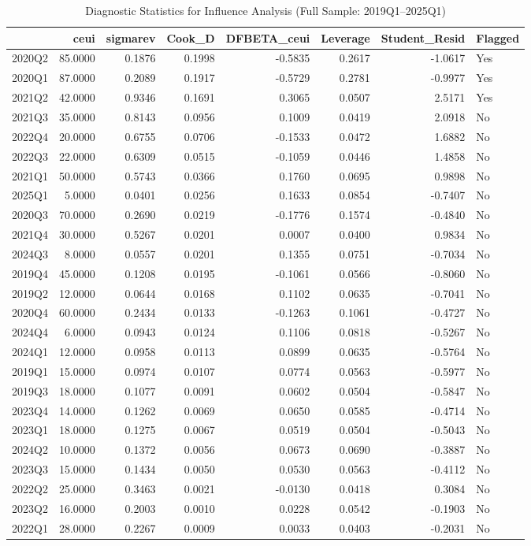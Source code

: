 \begin{table}
\caption{Diagnostic Statistics for Influence Analysis (Full Sample: 2019Q1--2025Q1)}
\label{tab:influence_appendix}
\begin{tabular}{lrrrrrrl}
\toprule
 & ceui & sigmarev & Cook_D & DFBETA_ceui & Leverage & Student_Resid & Flagged \\
\midrule
2020Q2 & 85.0000 & 0.1876 & 0.1998 & -0.5835 & 0.2617 & -1.0617 & Yes \\
2020Q1 & 87.0000 & 0.2089 & 0.1917 & -0.5729 & 0.2781 & -0.9977 & Yes \\
2021Q2 & 42.0000 & 0.9346 & 0.1691 & 0.3065 & 0.0507 & 2.5171 & Yes \\
2021Q3 & 35.0000 & 0.8143 & 0.0956 & 0.1009 & 0.0419 & 2.0918 & No \\
2022Q4 & 20.0000 & 0.6755 & 0.0706 & -0.1533 & 0.0472 & 1.6882 & No \\
2022Q3 & 22.0000 & 0.6309 & 0.0515 & -0.1059 & 0.0446 & 1.4858 & No \\
2021Q1 & 50.0000 & 0.5743 & 0.0366 & 0.1760 & 0.0695 & 0.9898 & No \\
2025Q1 & 5.0000 & 0.0401 & 0.0256 & 0.1633 & 0.0854 & -0.7407 & No \\
2020Q3 & 70.0000 & 0.2690 & 0.0219 & -0.1776 & 0.1574 & -0.4840 & No \\
2021Q4 & 30.0000 & 0.5267 & 0.0201 & 0.0007 & 0.0400 & 0.9834 & No \\
2024Q3 & 8.0000 & 0.0557 & 0.0201 & 0.1355 & 0.0751 & -0.7034 & No \\
2019Q4 & 45.0000 & 0.1208 & 0.0195 & -0.1061 & 0.0566 & -0.8060 & No \\
2019Q2 & 12.0000 & 0.0644 & 0.0168 & 0.1102 & 0.0635 & -0.7041 & No \\
2020Q4 & 60.0000 & 0.2434 & 0.0133 & -0.1263 & 0.1061 & -0.4727 & No \\
2024Q4 & 6.0000 & 0.0943 & 0.0124 & 0.1106 & 0.0818 & -0.5267 & No \\
2024Q1 & 12.0000 & 0.0958 & 0.0113 & 0.0899 & 0.0635 & -0.5764 & No \\
2019Q1 & 15.0000 & 0.0974 & 0.0107 & 0.0774 & 0.0563 & -0.5977 & No \\
2019Q3 & 18.0000 & 0.1077 & 0.0091 & 0.0602 & 0.0504 & -0.5847 & No \\
2023Q4 & 14.0000 & 0.1262 & 0.0069 & 0.0650 & 0.0585 & -0.4714 & No \\
2023Q1 & 18.0000 & 0.1275 & 0.0067 & 0.0519 & 0.0504 & -0.5043 & No \\
2024Q2 & 10.0000 & 0.1372 & 0.0056 & 0.0673 & 0.0690 & -0.3887 & No \\
2023Q3 & 15.0000 & 0.1434 & 0.0050 & 0.0530 & 0.0563 & -0.4112 & No \\
2022Q2 & 25.0000 & 0.3463 & 0.0021 & -0.0130 & 0.0418 & 0.3084 & No \\
2023Q2 & 16.0000 & 0.2003 & 0.0010 & 0.0228 & 0.0542 & -0.1903 & No \\
2022Q1 & 28.0000 & 0.2267 & 0.0009 & 0.0033 & 0.0403 & -0.2031 & No \\
\bottomrule
\end{tabular}
\end{table}
